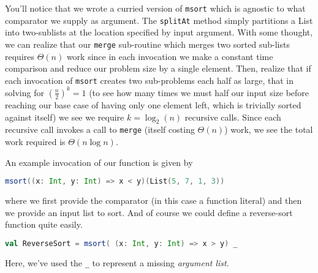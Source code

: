 \documentclass[12pt,letterpaper,twoside]{article}
\begin{document}
You'll notice that we wrote a curried version of \texttt{msort} which is agnostic to
what comparator we supply as argument.
The \texttt{splitAt} method simply partitions a List into two-sublists at
the location specified by input argument. With some thought, we can realize that
our \texttt{merge} sub-routine which merges two sorted sub-lists requires 
$\Theta(n)$  work since in each invocation we make a constant time comparison and
reduce our problem size by a single element. Then, realize that if each invocation
of \texttt{msort} creates two sub-problems each half as large, that in solving for
$\left(\frac{n}{2}\right)^k = 1$ (to see how many times we must half our input size before
reaching our base case of having only one element left, which is trivially sorted against
itself) we see we require $k = \log_2(n)$ recursive calls. Since each recursive call
invokes a call to \texttt{merge} (itself costing $\Theta(n)$) work, we see the total
work required is $\Theta(n \log n)$.

An example invocation of our function is given by
\begin{lstlisting}[language=Scala]
msort((x: Int, y: Int) => x < y)(List(5, 7, 1, 3)) \end{lstlisting}
where we first provide the comparator (in this case a function literal) and then we provide
an input list to sort.
And of course we could define a reverse-sort function quite easily.
\begin{lstlisting}[language=Scala]
val ReverseSort = msort( (x: Int, y: Int) => x > y) _ \end{lstlisting}
Here, we've used the \texttt{\_} to represent a missing \emph{argument list}.






 
\end{document}
